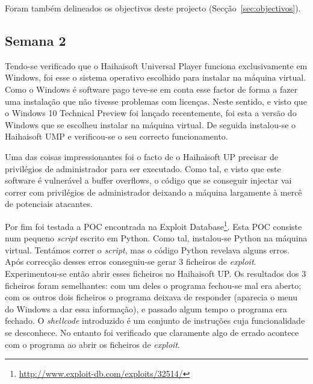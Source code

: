 \documentclass[a4paper]{article}
\begin{document}
Foram também delineados os objectivos deste projecto (Secção~\ref{sec:objectivos}).

\subsection{Semana 2}


Tendo-se verificado que o Haihaisoft Universal Player funciona exclusivamente em Windows, foi esse o sistema operativo escolhido para instalar na máquina virtual. Como o Windows é software pago teve-se em conta esse factor de forma a fazer uma instalação que não tivesse problemas com licenças. Neste sentido, e visto que o Windows 10 Technical Preview foi lançado recentemente, foi esta a versão do Windows que se escolheu instalar na máquina virtual. De seguida instalou-se o Haihaisoft UMP e verificou-se o seu correcto funcionamento.

Uma das coisas impressionantes foi o facto de o Haihaisoft UP precisar de privilégios de administrador para ser executado. Como tal, e visto que este software é vulnerável a buffer overflows, o código que se conseguir injectar vai correr com privilégios de administrador deixando a máquina largamente à mercê de potenciais atacantes.

Por fim foi testada a POC encontrada na Exploit Database\footnote{\url{http://www.exploit-db.com/exploits/32514/}}. Esta POC consiste num pequeno \textit{script} escrito em Python. Como tal, instalou-se Python na máquina virtual. Tentámos correr o \textit{script}, mas o código Python revelava alguns erros. Após correcção desses erros conseguiu-se gerar 3 ficheiros de \textit{exploit}. Experimentou-se então abrir esses ficheiros no Haihaisoft UP. Os resultados dos 3 ficheiros foram semelhantes: com um deles o programa fechou-se mal era aberto; com os outros dois ficheiros o programa deixava de responder (aparecia o menu do Windows a dar essa informação), e passado algum tempo o programa era fechado. O \textit{shellcode} introduzido é um conjunto de instruções cuja funcionalidade se desconhece. No entanto foi verificado que claramente algo de errado acontece com o programa ao abrir os ficheiros de \textit{exploit}.
\end{document}
